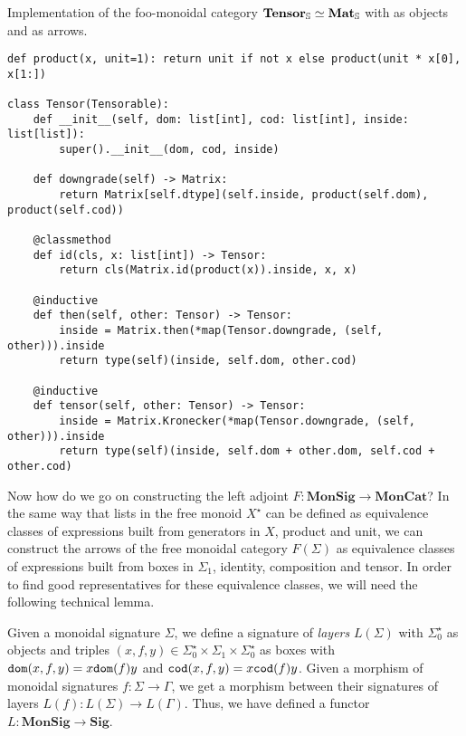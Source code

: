 \begin{python}
{\normalfont Implementation of the foo-monoidal category $\mathbf{Tensor}_\S \simeq \mathbf{Mat}_\S$ with  as objects and  as arrows.}

\begin{verbatim}
def product(x, unit=1): return unit if not x else product(unit * x[0], x[1:])

class Tensor(Tensorable):
    def __init__(self, dom: list[int], cod: list[int], inside: list[list]):
        super().__init__(dom, cod, inside)

    def downgrade(self) -> Matrix:
        return Matrix[self.dtype](self.inside, product(self.dom), product(self.cod))

    @classmethod
    def id(cls, x: list[int]) -> Tensor:
        return cls(Matrix.id(product(x)).inside, x, x)

    @inductive
    def then(self, other: Tensor) -> Tensor:
        inside = Matrix.then(*map(Tensor.downgrade, (self, other))).inside
        return type(self)(inside, self.dom, other.cod)

    @inductive
    def tensor(self, other: Tensor) -> Tensor:
        inside = Matrix.Kronecker(*map(Tensor.downgrade, (self, other))).inside
        return type(self)(inside, self.dom + other.dom, self.cod + other.cod)
\end{verbatim}
\end{python}

Now how do we go on constructing the left adjoint $F : \mathbf{MonSig} \to \mathbf{MonCat}$?
In the same way that lists in the free monoid $X^\star$ can be defined as equivalence classes of expressions built from generators in $X$, product and unit, we can construct the arrows of the free monoidal category $F(\Sigma)$ as equivalence classes of expressions built from boxes in $\Sigma_1$, identity, composition and tensor.
In order to find good representatives for these equivalence classes, we will need the following technical lemma.

\begin{definition}
Given a monoidal signature $\Sigma$, we define a signature of \emph{layers} $L(\Sigma)$ with $\Sigma_0^\star$ as objects and triples $(x, f, y) \in \Sigma_0^\star \times \Sigma_1 \times \Sigma_0^\star$ as boxes with $\dom(x, f, y) = x \dom(f) y$ and $\cod(x, f, y) = x \cod(f) y$.
Given a morphism of monoidal signatures $f : \Sigma \to \Gamma$, we get a morphism between their signatures of layers $L(f) : L(\Sigma) \to L(\Gamma)$.
Thus, we have defined a functor $L : \mathbf{MonSig} \to \mathbf{Sig}$.
\end{definition}

